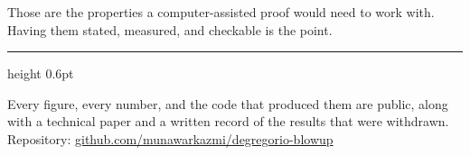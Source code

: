 \documentclass[11pt,a4paper]{article}
\begin{document}
Those are the properties a computer-assisted proof would need to work with.
Having them stated, measured, and checkable is the point.

\vspace{6pt}
{\color{rulegold}\hrule height 0.6pt}
\vspace{6pt}

{\small Every figure, every number, and the code that produced them are public,
along with a technical paper and a written record of the results that were
withdrawn.\\
Repository: \href{https://github.com/munawarkazmi/degregorio-blowup}%
{github.com/munawarkazmi/degregorio-blowup}}
\end{document}
